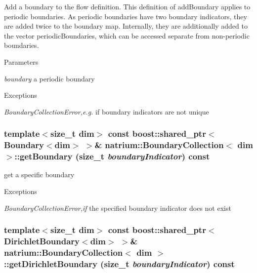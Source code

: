 Add a boundary to the flow definition. This definition of addBoundary applies to periodic boundaries. As periodic boundaries have two boundary indicators, they are added twice to the boundary map. Internally, they are additionally added to the vector periodicBoundaries, which can be accessed separate from non-\/periodic boundaries. 
\begin{DoxyParams}{Parameters}
\item[{\em boundary}]a periodic boundary \end{DoxyParams}

\begin{DoxyExceptions}{Exceptions}
\item[{\em BoundaryCollectionError,e.g.}]if boundary indicators are not unique \end{DoxyExceptions}
\hypertarget{classnatrium_1_1BoundaryCollection_a44816fa48b8100fb37b8ad7491c2cc6c}{
\subsubsection[{getBoundary}]{\setlength{\rightskip}{0pt plus 5cm}template$<$size\_\-t dim$>$ const boost::shared\_\-ptr$<${\bf Boundary}$<$dim$>$ $>$\& {\bf natrium::BoundaryCollection}$<$ dim $>$::getBoundary (size\_\-t {\em boundaryIndicator}) const}}
\label{classnatrium_1_1BoundaryCollection_a44816fa48b8100fb37b8ad7491c2cc6c}


get a specific boundary 
\begin{DoxyExceptions}{Exceptions}
\item[{\em BoundaryCollectionError,if}]the specified boundary indicator does not exist \end{DoxyExceptions}
\hypertarget{classnatrium_1_1BoundaryCollection_a26c06388387177b5272425c53d00fefa}{
\subsubsection[{getDirichletBoundary}]{\setlength{\rightskip}{0pt plus 5cm}template$<$size\_\-t dim$>$ const boost::shared\_\-ptr$<${\bf DirichletBoundary}$<$dim$>$ $>$\& {\bf natrium::BoundaryCollection}$<$ dim $>$::getDirichletBoundary (size\_\-t {\em boundaryIndicator}) const}}
\label{classnatrium_1_1BoundaryCollection_a26c06388387177b5272425c53d00fefa}


